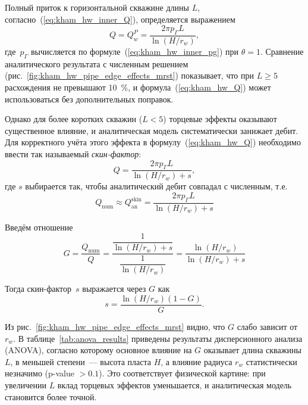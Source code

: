 \documentclass{article}
\begin{document}
Полный приток к горизонтальной скважине длины $L$, согласно~(\ref{eq:kham_hw_inner_Q}), определяется выражением
\begin{equation}
	\displaystyle
	Q = Q_w^P = \dfrac{2 \pi p_{\Gamma} L}{\ln \left( H / r_w \right)},
	\label{eq:kham_hw_Q}
\end{equation}
где~$p_{\Gamma}$ вычисляется по формуле~(\ref{eq:kham_hw_inner_pg}) при $\theta=1$.
Сравнение аналитического результата с численным решением (рис.~\ref{fig:kham_hw_pipe_edge_effects_mrst})
показывает, что при $L \geq 5$ расхождения не превышают 10~\%, и формула~(\ref{eq:kham_hw_Q})
может использоваться без дополнительных поправок.

Однако для более коротких скважин ($L < 5$) торцевые эффекты оказывают существенное влияние,
и аналитическая модель систематически занижает дебит. Для корректного учёта этого эффекта
в формулу~(\ref{eq:kham_hw_Q}) необходимо ввести так называемый \textit{скин-фактор}:
\begin{equation}
	\displaystyle
	Q = \dfrac{2 \pi p_{\Gamma} L}{\ln \left( H / r_w \right) + s},
	\label{eq:kham_hw_Q_skin}
\end{equation}
где $s$ выбирается так, чтобы аналитический дебит совпадал с численным,
т.е.
\begin{equation*}
	\displaystyle
	Q_{\text{num}} \approx Q_{\text{an}}^{\text{skin}} = \dfrac{2 \pi p_{\Gamma} L}{\ln \left( H / r_w \right) + s}
\end{equation*}

Введём отношение
\begin{equation}
	\displaystyle
	G = \dfrac{Q_{\text{num}}}{Q} = \dfrac{\dfrac{1}{\ln \left( H / r_w \right) + s}}{\dfrac{1}{\ln \left( H / r_w \right)}}  =
	\dfrac{\ln  \left( H / r_w \right)}{\ln  \left( H / r_w \right) + s}
	\label{eq:kham_hw_skin_G}
\end{equation}

Тогда скин-фактор~$s$ выражается через $G$ как
\begin{equation}
	\displaystyle
	s = \dfrac{\ln  \left( H / r_w \right) \left(1-G \right)}{G}.
	\label{eq:kham_hw_skin}
\end{equation}

Из рис.~\ref{fig:kham_hw_pipe_edge_effects_mrst} видно, что $G$ слабо зависит от $r_w$.
В таблице~\ref{tab:anova_results} приведены результаты дисперсионного анализа (ANOVA),
согласно которому основное влияние на $G$ оказывает длина скважины $L$, в меньшей степени~---
высота пласта $H$, а влияние радиуса $r_w$ статистически незначимо (p-value $>0.1$).
Это соответствует физической картине: при увеличении $L$ вклад торцевых эффектов уменьшается,
и аналитическая модель становится более точной.
\end{document}
